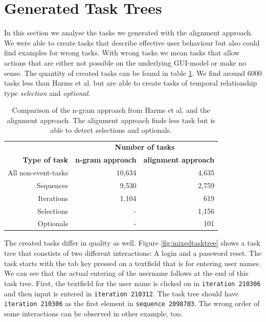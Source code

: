 \section{Generated Task Trees}
In this section we analyse the tasks we generated with the alignment approach. 
We were able to create tasks that describe effective user behaviour but also could find examples for wrong tasks.
With wrong tasks we mean tasks that allow actions that are either not possible on the underlying GUI-model or make no sense.
The quantity of created tasks can be found in table \ref{tab:taskquantity}. 
We find around 6000 tasks less than Harms et al. but are able to create tasks of temporal relationship type \textit{selection} and \textit{optional}.

\begin{table}
	\centering
	\begin{tabular}{ r r r }
	   \toprule
	    & \multicolumn{2}{c}{\textbf{Number of tasks}} \\
		\cmidrule{2-3}
		\textbf{Type of task}& \textbf{n-gram approach} & \textbf{alignment approach} \\
	   \midrule
	   All non-event-tasks 	& 10,634 			& 4,635 \\
		\midrule
	   Sequences 				& 9,530 				& 2,759 \\
	   Iterations 				& 1,104 				& 619 \\
	   Selections 				& -\hspace{12pt}	& 1,156 \\
	   Optionals 				& -\hspace{12pt} 	& 101 \\
	   \bottomrule
\end{tabular}
\caption{Comparison of the n-gram approach from Harms et al. and the alignment approach. The alignment approach finds less task but is able to detect selections and optionals.}
\label{tab:taskquantity}
\end{table}

The created tasks differ in quality as well. 
Figure \ref{fig:mixedtasktree} shows a task tree that constists of two different interactions: A login and a password reset.
The task starts with the tab key pressed on a textfield that is for entering user names. 
We can see that the actual entering of the username follows at the end of this task tree. 
First, the textfield for the user name is clicked on in \texttt{iteration 210306} and then input is entered in \texttt{iteration 210312}. 
The task tree should have \texttt{iteration 210306} as the first element in \texttt{sequence 2098703}.
The wrong order of some interactions can be observed in other example, too.  

